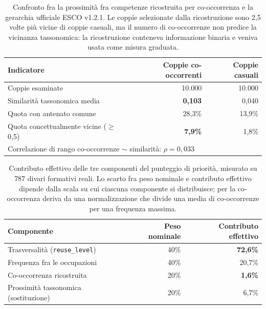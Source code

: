 \begin{table}[htbp]
  \centering
  \caption{Confronto fra la prossimità fra competenze ricostruita per
           co-occorrenza e la gerarchia ufficiale ESCO v1.2.1. Le coppie
           selezionate dalla ricostruzione sono 2,5 volte più vicine di
           coppie casuali, ma il numero di co-occorrenze non predice la
           vicinanza tassonomica: la ricostruzione conteneva informazione
           binaria e veniva usata come misura graduata.}
  \label{tab:skill-graph-accordo}
  \begin{tabular}{lrr}
    \toprule
    \textbf{Indicatore} & \textbf{Coppie co-occorrenti}
      & \textbf{Coppie casuali} \\
    \midrule
    Coppie esaminate                       & 10.000 & 10.000 \\
    Similarità tassonomica media           & \textbf{0,103} & 0,040 \\
    Quota con antenato comune              & 28,3\% & 13,9\% \\
    Quota concettualmente vicine ($\geq$ 0,5) & \textbf{7,9\%} & 1,8\% \\
    \midrule
    \multicolumn{3}{l}{Correlazione di rango co-occorrenze $\sim$ similarità:
      $\rho = 0{,}033$} \\
    \bottomrule
  \end{tabular}
\end{table}

\begin{table}[htbp]
  \centering
  \caption{Contributo effettivo delle tre componenti del punteggio di
           priorità, misurato su 787 divari formativi reali. Lo scarto fra
           peso nominale e contributo effettivo dipende dalla scala su cui
           ciascuna componente si distribuisce; per la co-occorrenza deriva
           da una normalizzazione che divide una media di co-occorrenze per
           una frequenza massima.}
  \label{tab:skill-graph-contributi}
  \begin{tabular}{lrr}
    \toprule
    \textbf{Componente} & \textbf{Peso nominale}
      & \textbf{Contributo effettivo} \\
    \midrule
    Trasversalità (\texttt{reuse\_level}) & 40\% & \textbf{72,6\%} \\
    Frequenza fra le occupazioni          & 40\% & 20,7\% \\
    Co-occorrenza ricostruita             & 20\% & \textbf{1,6\%} \\
    \midrule
    Prossimità tassonomica (sostituzione) & 20\% & 6,7\% \\
    \bottomrule
  \end{tabular}
\end{table}


